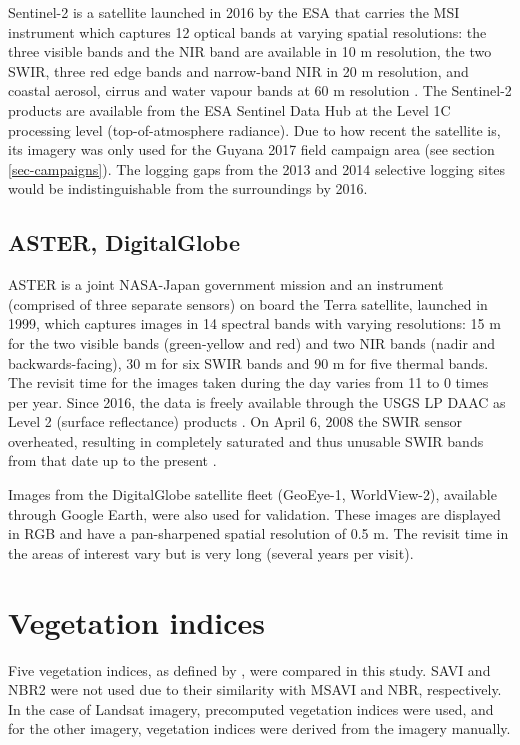 \documentclass[a4paper,12pt]{scrbook}
\begin{document}
Sentinel-2 is a satellite launched in 2016 by the \ac{ESA} that carries the \ac{MSI} instrument which captures 12 optical bands at varying spatial resolutions: the three visible bands and the \ac{NIR} band are available in 10 m resolution, the two \ac{SWIR}, three red edge bands and narrow-band \ac{NIR} in 20 m resolution, and coastal aerosol, cirrus and water vapour bands at 60 m resolution \citep{suhet_sentinel-2_2015}. The Sentinel-2 products are available from the \ac{ESA} Sentinel Data Hub at the Level 1C processing level (top-of-atmosphere radiance). Due to how recent the satellite is, its imagery was only used for the Guyana 2017 field campaign area (see section \ref{sec-campaigns}). The logging gaps from the 2013 and 2014 selective logging sites would be indistinguishable from the surroundings by 2016.

\subsection{ASTER, DigitalGlobe}

\ac{ASTER} is a joint NASA-Japan government mission and an instrument (comprised of three separate sensors) on board the Terra satellite, launched in 1999, which captures images in 14 spectral bands with varying resolutions: 15 m for the two visible bands (green-yellow and red) and two \ac{NIR} bands (nadir and backwards-facing), 30 m for six \ac{SWIR} bands and 90 m for five thermal bands. The revisit time for the images taken during the day varies from 11 to 0 times per year. Since 2016, the data is freely available through the \ac{USGS} \ac{LP DAAC} as Level 2 (surface reflectance) products \citep{nasa_lp_daac_aster_2006}. On April 6, 2008 the \ac{SWIR} sensor overheated, resulting in completely saturated and thus unusable \ac{SWIR} bands from that date up to the present \citep{meyer_advanced_2015}.

Images from the DigitalGlobe satellite fleet (GeoEye-1, WorldView-2), available through Google Earth, were also used for validation. These images are displayed in \ac{RGB} and have a pan-sharpened spatial resolution of 0.5 m. The revisit time in the areas of interest vary but is very long (several years per visit).

\section{Vegetation indices} \label{sec-vis}

Five vegetation indices, as defined by \citet{u.s._geological_survey_product_2017_3}, were compared in this study. \ac{SAVI} and \ac{NBR2} were not used due to their similarity with \ac{MSAVI} and \ac{NBR}, respectively. In the case of Landsat imagery, precomputed vegetation indices were used, and for the other imagery, vegetation indices were derived from the imagery manually.
\end{document}
